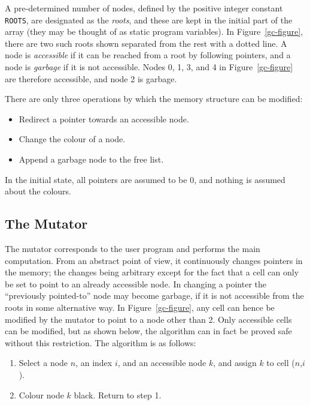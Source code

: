A pre-determined number of   nodes, defined  by the positive   integer
constant {\tt  ROOTS}, are designated  as the  {\em roots},  and these are
kept in the initial  part  of the array (they   may be thought of   as
static program variables).   In  Figure~\ref{gc-figure}, there  are two
such  roots shown separated from the rest with a dotted line. A node is {\em
accessible} 
if it can be reached from a root by  following pointers, and a node is
{\em garbage} if it is not accessible. Nodes 0, 1, 3, and 
4  in Figure~\ref{gc-figure} are therefore accessible, and node 2 is
garbage. 

\noindent There  are  only three operations by which
the memory structure can be modified:

\begin{itemize}
  \item Redirect a pointer towards an accessible node.
  \item Change the colour of a node.
  \item Append a garbage node to the free list.
\end{itemize}

\noindent In the initial state, all pointers are assumed to  be 0, 
and nothing is assumed about the colours.


\subsection{The Mutator}

The mutator  corresponds to  the user  program  and performs the  main
computation.  From an abstract point of  view, it continuously changes
pointers  in the memory; the   changes being arbitrary except for  the
fact that  a cell can  only be set to point  to an  already accessible
node. In  changing a  pointer  the ``previously pointed-to'' node  may
become garbage,  if it  is  not accessible   from  the roots  in  some
alternative way.  In  Figure~\ref{gc-figure}, any cell can hence be
modified by the 
mutator to point to a node other than  2.  Only
accessible  cells can be modified, but as shown below,  the algorithm can
in fact be proved safe  without this restriction.  The algorithm is as
follows: 
\begin{enumerate}

\item Select a node $n$, an index $i$, and an accessible node $k$,
      and assign $k$ to cell ($n$,$i$). 
      
\item Colour node $k$ black. Return to step 1.

\end{enumerate}

